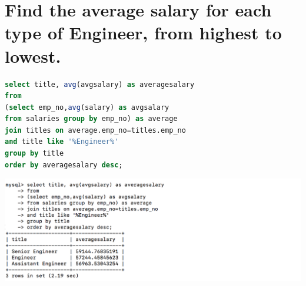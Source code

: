 \documentclass{article}
\begin{document}
\section{Find the average salary for each type of Engineer, from highest to lowest.}
\begin{lstlisting}[language=sql]
select title, avg(avgsalary) as averagesalary
from 
(select emp_no,avg(salary) as avgsalary
from salaries group by emp_no) as average
join titles on average.emp_no=titles.emp_no 
and title like '%Engineer%'
group by title
order by averagesalary desc;
\end{lstlisting}
\includegraphics[width=\linewidth]{4.png}
\end{document}
